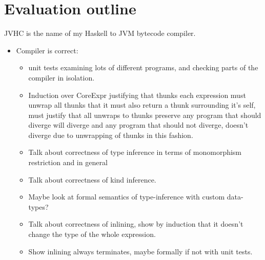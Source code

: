 \documentclass[a4paper]{article}
\begin{document}
\section*{Evaluation outline}
JVHC is the name of my Haskell to JVM bytecode compiler.
\begin{itemize}
  \item Compiler is correct: 
    \begin{itemize}
      \item unit tests examining lots of different programs, and checking
        parts of the compiler in isolation.
      \item Induction over CoreExpr justifying that thunks each expression
        must unwrap all thunks that it must also return a thunk surrounding
        it's self, must justify that all unwraps to thunks preserve 
        any program that should diverge will diverge and 
        any program that should not diverge, doesn't diverge due 
        to unwrapping of thunks in this fashion.
        
      \item Talk about correctness of type inference in terms of  monomorphism
        restriction and in general
      \item Talk about correctness of kind inference.

      \item Maybe look at formal semantics of type-inference
          with custom data-types?

      \item Talk about correctness of inlining, show by induction that
        it doesn't change the type of the whole expression.

      \item Show inlining always terminates, maybe formally if not 
        with unit tests.
    \end{itemize}


\end{itemize}
\end{document}
